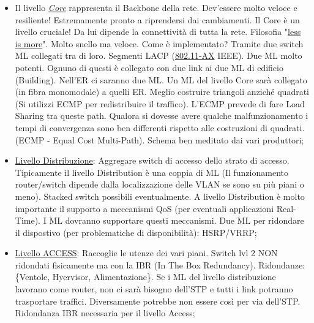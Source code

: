 \begin{itemize}

\item Il livello \underline{\textit{Core}} rappresenta il Backbone della rete. Dev'essere molto veloce e resiliente! Estremamente pronto a riprendersi dai cambiamenti. Il Core è un livello cruciale! Da lui dipende la connettività di tutta la rete. Filosofia "\underline{less is more}". Molto snello ma veloce. Come è implementato? Tramite due switch ML collegati tra di loro. Segmenti LACP (\underline{802.11-AX} IEEE). Due ML molto potenti. Ognuno di questi è collegato con due link ai due ML di edificio (Building). Nell'ER ci saranno due ML. Un ML del livello Core sarà collegato (in fibra monomodale) a quelli ER. Meglio costruire triangoli anziché quadrati (Si utilizzi ECMP per redistribuire il traffico). L'ECMP prevede di fare Load Sharing tra queste path. Qualora si dovesse avere qualche malfunzionamento i tempi di convergenza sono ben differenti rispetto alle costruzioni di quadrati. (ECMP - Equal Cost Multi-Path). Schema ben meditato dai vari produttori;

\item{\underline{Livello Distribuzione}}: Aggregare switch di accesso dello strato di accesso. Tipicamente il livello Distribution è una coppia di ML (Il funzionamento router/switch dipende dalla localizzazione delle VLAN se sono su più piani o meno). Stacked switch possibili eventualmente. A livello Distribution è molto importante il supporto a meccanismi QoS (per eventuali applicazioni Real-Time). I ML dovranno supportare questi meccanismi. Due ML per ridondare il dispostivo (per problematiche di disponibilità): HSRP/VRRP;

\item{\underline{Livello ACCESS}}: Raccoglie le utenze dei vari piani. Switch lvl 2 NON ridondati fisicamente ma con la IBR (In The Box Redundancy). Ridondanze: \{Ventole, Hyervisor, Alimentazione\}. Se i ML del livello distribuzione lavorano come router, non ci sarà bisogno dell'STP e tutti i link potranno trasportare traffici. Diversamente potrebbe non essere così per via dell'STP. Ridondanza IBR necessaria per il livello Access;

\end{itemize}

